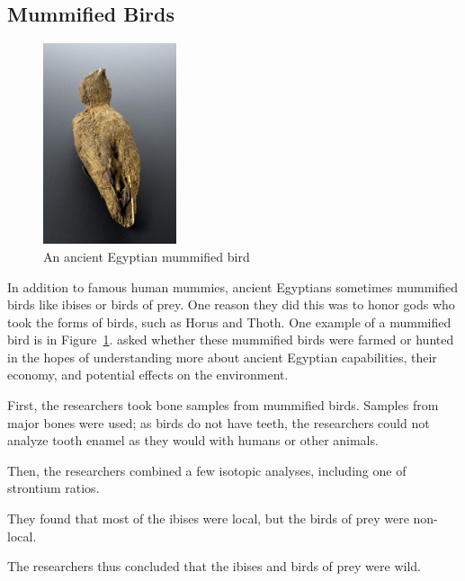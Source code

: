 \documentclass[a4paper, 12pt]{article}
\begin{document}
\subsection{Mummified Birds}
\begin{figure}[htbp]
    \centering
    \includegraphics[width=0.35\textwidth]{mummy_bird.jpg}
    \caption{An ancient Egyptian mummified bird \citep{wikipediaBird}}
    \label{fig:mummy_bird}
\end{figure}
In addition to famous human mummies, ancient Egyptians sometimes mummified birds
like ibises or birds of prey. One reason they did this was to honor gods who took
the forms of birds, such as Horus and Thoth. One example of a mummified bird is in Figure~\ref{fig:mummy_bird}.
\cite{linglin2020} asked whether these mummified birds were farmed or hunted in the hopes of understanding
more about ancient Egyptian capabilities, their economy, and potential effects on
the environment.

First, the researchers took bone samples from mummified birds. Samples from major bones were used;
as birds do not have teeth, the researchers could not analyze tooth enamel as they would
with humans or other animals.

Then, the researchers combined a few isotopic analyses, including one of strontium ratios.


They found that most of the ibises were local, but the birds of prey were non-local.

The researchers thus concluded that the ibises and birds of prey were wild.


\end{document}
